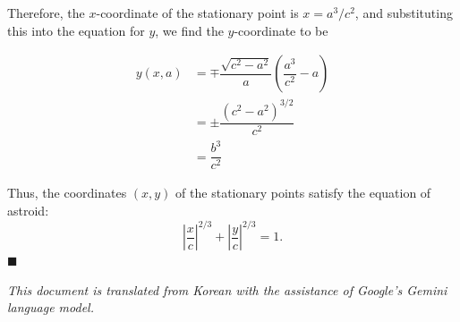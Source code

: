 \documentclass[twocolumn]{article}
\begin{document}
Therefore, the $x$-coordinate of the stationary point is $x = a^3/c^2$, and substituting this into the equation for $y$, we find the $y$-coordinate to be

$$ \begin{aligned}
	y(x, a) &= \mp \dfrac{\sqrt{c^2-a^2}}{a}\left(\dfrac{a^3}{c^2}-a\right)\\
	& = \pm \dfrac{\left( c^2- a^2 \right)^{3/2}}{c^2}\\
	& = \dfrac{b^3}{c^2}
\end{aligned}
$$

Thus, the coordinates $(x, y)$ of the stationary points satisfy the equation of astroid:
$$\left|\dfrac{x}{c}\right|^{2/3} + \left|\dfrac{y}{c}\right|^{2/3} = 1.$$
$\blacksquare$

\vfill

\slshape{This document is translated from Korean with the assistance of Google's Gemini language model.}
%
%
\end{document}
